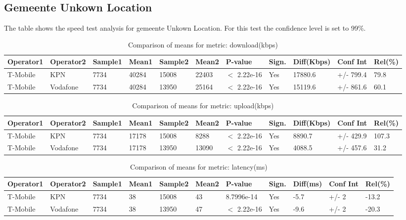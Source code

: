\documentclass[]{article}
\begin{document}
\normalsize

\newpage

\subsection{Gemeente Unkown Location}\label{gemeente-unkown-location}

The table shows the speed test analysis for gemeente Unkown Location.
For this test the confidence level is set to 99\%.

\begin{table}[ht]
\centering
{\footnotesize
\begin{tabular}{lllllllllll}
  \hline
Operator1 & Operator2 & Sample1 & Mean1 & Sample2 & Mean2 & P-value & Sign. & Diff(Kbps) & Conf Int & Rel(\%) \\ 
  \hline
T-Mobile & KPN & 7734 & 40284 & 15008 & 22403 & $<$ 2.22e-16 & Yes & 17880.6 & +/- 799.4 & 79.8 \\ 
  T-Mobile & Vodafone & 7734 & 40284 & 13950 & 25164 & $<$ 2.22e-16 & Yes & 15119.6 & +/- 861.6 & 60.1 \\ 
   \hline
\end{tabular}
}
\caption{Comparison of means for metric: download(kbps)} 
\end{table}

\begin{table}[ht]
\centering
{\footnotesize
\begin{tabular}{lllllllllll}
  \hline
Operator1 & Operator2 & Sample1 & Mean1 & Sample2 & Mean2 & P-value & Sign. & Diff(Kbps) & Conf Int & Rel(\%) \\ 
  \hline
T-Mobile & KPN & 7734 & 17178 & 15008 & 8288 & $<$ 2.22e-16 & Yes & 8890.7 & +/- 429.9 & 107.3 \\ 
  T-Mobile & Vodafone & 7734 & 17178 & 13950 & 13090 & $<$ 2.22e-16 & Yes & 4088.5 & +/- 457.6 & 31.2 \\ 
   \hline
\end{tabular}
}
\caption{Comparison of means for metric: upload(kbps)} 
\end{table}

\begin{table}[ht]
\centering
{\footnotesize
\begin{tabular}{lllllllllll}
  \hline
Operator1 & Operator2 & Sample1 & Mean1 & Sample2 & Mean2 & P-value & Sign. & Diff(ms) & Conf Int & Rel(\%) \\ 
  \hline
T-Mobile & KPN & 7734 & 38 & 15008 & 43 & 8.7996e-14 & Yes & -5.7 & +/- 2 & -13.2 \\ 
  T-Mobile & Vodafone & 7734 & 38 & 13950 & 47 & $<$ 2.22e-16 & Yes & -9.6 & +/- 2 & -20.3 \\ 
   \hline
\end{tabular}
}
\caption{Comparison of means for metric: latency(ms)} 
\end{table}
\end{document}
